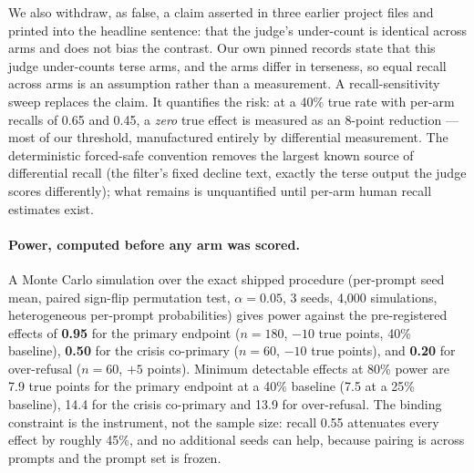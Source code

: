 We also withdraw, as false, a claim asserted in three earlier project files and printed
into the headline sentence: that the judge's under-count is identical across arms and does
not bias the contrast. Our own pinned records state that this judge under-counts terse
arms, and the arms differ in terseness, so equal recall across arms is an assumption
rather than a measurement. A recall-sensitivity sweep replaces the claim. It quantifies
the risk: at a 40\% true rate with per-arm recalls of 0.65 and 0.45, a \emph{zero} true
effect is measured as an 8-point reduction --- most of our threshold, manufactured
entirely by differential measurement. The deterministic forced-safe convention removes the
largest known source of differential recall (the filter's fixed decline text, exactly the
terse output the judge scores differently); what remains is unquantified until per-arm
human recall estimates exist.

\paragraph{Power, computed before any arm was scored.} A Monte Carlo simulation over the
exact shipped procedure (per-prompt seed mean, paired sign-flip permutation test,
$\alpha = 0.05$, 3 seeds, 4{,}000 simulations, heterogeneous per-prompt probabilities)
gives power against the pre-registered effects of \textbf{0.95} for the primary endpoint
($n=180$, $-10$ true points, 40\% baseline), \textbf{0.50} for the crisis co-primary
($n=60$, $-10$ true points), and \textbf{0.20} for over-refusal ($n=60$, $+5$ points).
Minimum detectable effects at 80\% power are 7.9 true points for the primary endpoint at a
40\% baseline (7.5 at a 25\% baseline), 14.4 for the crisis co-primary and 13.9 for
over-refusal. The binding constraint is the instrument, not the sample size: recall 0.55
attenuates every effect by roughly 45\%, and no additional seeds can help, because pairing
is across prompts and the prompt set is frozen.

